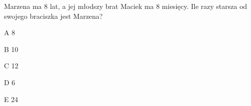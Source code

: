 \begin{tresc}
Marzena ma 8 lat, a jej młodszy brat Maciek ma 8 miesięcy. Ile razy starsza od swojego braciszka jest Marzena?
\end{tresc}
\begin{wariant}{A} 8 \end{wariant}
\begin{wariant}{B} 10 \end{wariant}
\begin{wariant}{C} 12 \end{wariant}
\begin{wariant}{D} 6 \end{wariant}
\begin{wariant}{E} 24 \end{wariant}
